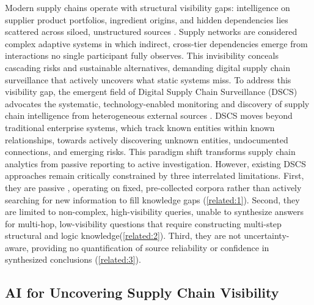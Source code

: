 \documentclass{article}
\begin{document}
Modern supply chains operate with structural visibility gaps: intelligence on supplier product portfolios, ingredient origins, and hidden dependencies lies scattered across siloed, unstructured sources \citep{agrawal2024supply, kalaiarasan2023supply}. Supply networks are considered complex adaptive systems \citep{choi2001supply} in which indirect, cross-tier dependencies emerge from interactions no single participant fully observes. This invisibility conceals cascading risks and sustainable alternatives, demanding digital supply chain surveillance that actively uncovers what static systems miss.
To address this visibility gap, the emergent field of Digital Supply Chain Surveillance (DSCS) advocates the systematic, technology-enabled monitoring and discovery of supply chain intelligence from heterogeneous external sources \citep{brintrup2024digital}. DSCS moves beyond traditional enterprise systems, which track known entities within known relationships, towards actively discovering unknown entities, undocumented connections, and emerging risks. This paradigm shift transforms supply chain analytics from passive reporting to active investigation.
However, existing DSCS approaches remain critically constrained by three interrelated limitations. First, they are passive \citep{zheng2025enhancing}, operating on fixed, pre-collected corpora rather than actively searching for new information to fill knowledge gaps (\autoref{related:1}). Second, they are limited to non-complex, high-visibility queries, unable to synthesize answers for multi-hop, low-visibility questions that require constructing multi-step structural and logic knowledge(\autoref{related:2}). Third, they are not uncertainty-aware, providing no quantification of source reliability or confidence in synthesized conclusions (\autoref{related:3}).

\subsection{AI for Uncovering Supply Chain Visibility}
\label{related:1}
\end{document}
